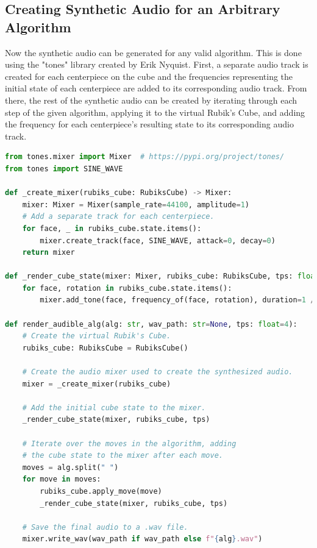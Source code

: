 \subsection{Creating Synthetic Audio for an Arbitrary Algorithm}
\label{subsec:generate-audible-algorithm}
Now the synthetic audio can be generated for any valid algorithm.
This is done using the "tones" library \cite{pip-tones} created by Erik Nyquist.
First, a separate audio track is created for each centerpiece on the cube and the frequencies representing the initial state of each centerpiece are added to its corresponding audio track.
From there, the rest of the synthetic audio can be created by iterating through each step of the given algorithm, applying it to the virtual Rubik's Cube, and adding the frequency for each centerpiece's resulting state to its corresponding audio track.

\begin{lstlisting}[language=Python]
from tones.mixer import Mixer  # https://pypi.org/project/tones/
from tones import SINE_WAVE
    
def _create_mixer(rubiks_cube: RubiksCube) -> Mixer:
    mixer: Mixer = Mixer(sample_rate=44100, amplitude=1)
    # Add a separate track for each centerpiece.
    for face, _ in rubiks_cube.state.items():
        mixer.create_track(face, SINE_WAVE, attack=0, decay=0)
    return mixer

def _render_cube_state(mixer: Mixer, rubiks_cube: RubiksCube, tps: float):
    for face, rotation in rubiks_cube.state.items():
        mixer.add_tone(face, frequency_of(face, rotation), duration=1 / tps)

def render_audible_alg(alg: str, wav_path: str=None, tps: float=4):
    # Create the virtual Rubik's Cube.
    rubiks_cube: RubiksCube = RubiksCube()
    
    # Create the audio mixer used to create the synthesized audio.
    mixer = _create_mixer(rubiks_cube)
    
    # Add the initial cube state to the mixer.
    _render_cube_state(mixer, rubiks_cube, tps)
    
    # Iterate over the moves in the algorithm, adding
    # the cube state to the mixer after each move.
    moves = alg.split(" ")
    for move in moves:
        rubiks_cube.apply_move(move)
        _render_cube_state(mixer, rubiks_cube, tps)
    
    # Save the final audio to a .wav file.
    mixer.write_wav(wav_path if wav_path else f"{alg}.wav")
\end{lstlisting}

